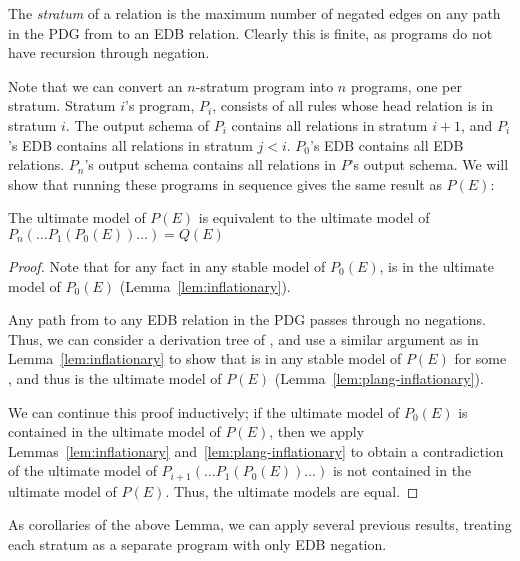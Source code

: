 

The {\em stratum} of a relation  is the maximum number of negated edges on any path in the PDG from  to an EDB relation.  Clearly this is finite, as \plang programs do not have recursion through negation.

Note that we can convert an $n$-stratum \plang program into $n$ \slang programs, one per stratum.  Stratum $i$'s program, $P_i$, consists of all rules whose head relation is in stratum $i$.  The output schema of $P_i$ contains all relations in stratum $i+1$, and $P_i$'s EDB contains all relations in stratum $j < i$.  $P_0$'s EDB contains all EDB relations.  $P_n$'s output schema contains all relations in $P$'s output schema.  We will show that running these programs in sequence gives the same result as $P(E)$:

\begin{lemma}
\label{lem:can-stratify}
The ultimate model of $P(E)$ is equivalent to the ultimate model of $P_n(\ldots P_1(P_0(E)) \ldots ) = Q(E)$
\end{lemma}
\begin{proof}
Note that for any fact  in any stable model of $P_0(E)$,  is in the ultimate model of $P_0(E)$ (Lemma~\ref{lem:inflationary}).

Any path from  to any EDB relation in the PDG passes through no negations.  Thus, we can consider a derivation tree of , and use a similar argument as in Lemma~\ref{lem:inflationary} to show that  is in any stable model of $P(E)$ for some , and thus is the ultimate model of $P(E)$ (Lemma~\ref{lem:plang-inflationary}).

We can continue this proof inductively; if the ultimate model of $P_0(E)$ is contained in the ultimate model of $P(E)$, then we apply Lemmas~\ref{lem:inflationary} and~\ref{lem:plang-inflationary} to obtain a contradiction of the ultimate model of $P_{i+1}(\ldots P_1(P_0(E)) \ldots)$ is not contained in the ultimate model of $P(E)$.  Thus, the ultimate models are equal.
\end{proof}

As corollaries of the above Lemma, we can apply several previous results, treating each stratum as a separate program with only EDB negation.

